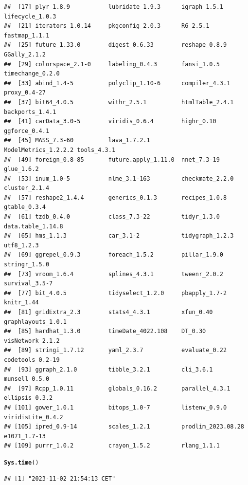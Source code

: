 \documentclass{article}\usepackage[]{graphicx}\usepackage[]{xcolor}
\makeatletter
\newcommand{\hlstd}[1]{\textcolor[rgb]{0.345,0.345,0.345}{#1}}%
\newcommand{\hlkwd}[1]{\textcolor[rgb]{0.737,0.353,0.396}{\textbf{#1}}}%
\newenvironment{kframe}{%
 \def\at@end@of@kframe{}%
 \ifinner\ifhmode%
  \def\at@end@of@kframe{\end{minipage}}%
  \begin{minipage}{\columnwidth}%
 \fi\fi%
 \def\FrameCommand##1{\hskip\@totalleftmargin \hskip-\fboxsep
 \colorbox{shadecolor}{##1}\hskip-\fboxsep
     \hskip-\linewidth \hskip-\@totalleftmargin \hskip\columnwidth}%
 \MakeFramed {\advance\hsize-\width
   \@totalleftmargin\z@ \linewidth\hsize
   \@setminipage}}%
 {\par\unskip\endMakeFramed%
 \at@end@of@kframe}
\newenvironment{knitrout}{}{} %
\makeatother
\begin{document}
\begin{knitrout}
\begin{kframe}
\begin{verbatim}
##  [17] plyr_1.8.9           lubridate_1.9.3      igraph_1.5.1         lifecycle_1.0.3     
##  [21] iterators_1.0.14     pkgconfig_2.0.3      R6_2.5.1             fastmap_1.1.1       
##  [25] future_1.33.0        digest_0.6.33        reshape_0.8.9        GGally_2.1.2        
##  [29] colorspace_2.1-0     labeling_0.4.3       fansi_1.0.5          timechange_0.2.0    
##  [33] abind_1.4-5          polyclip_1.10-6      compiler_4.3.1       proxy_0.4-27        
##  [37] bit64_4.0.5          withr_2.5.1          htmlTable_2.4.1      backports_1.4.1     
##  [41] carData_3.0-5        viridis_0.6.4        highr_0.10           ggforce_0.4.1       
##  [45] MASS_7.3-60          lava_1.7.2.1         ModelMetrics_1.2.2.2 tools_4.3.1         
##  [49] foreign_0.8-85       future.apply_1.11.0  nnet_7.3-19          glue_1.6.2          
##  [53] inum_1.0-5           nlme_3.1-163         checkmate_2.2.0      cluster_2.1.4       
##  [57] reshape2_1.4.4       generics_0.1.3       recipes_1.0.8        gtable_0.3.4        
##  [61] tzdb_0.4.0           class_7.3-22         tidyr_1.3.0          data.table_1.14.8   
##  [65] hms_1.1.3            car_3.1-2            tidygraph_1.2.3      utf8_1.2.3          
##  [69] ggrepel_0.9.3        foreach_1.5.2        pillar_1.9.0         stringr_1.5.0       
##  [73] vroom_1.6.4          splines_4.3.1        tweenr_2.0.2         survival_3.5-7      
##  [77] bit_4.0.5            tidyselect_1.2.0     pbapply_1.7-2        knitr_1.44          
##  [81] gridExtra_2.3        stats4_4.3.1         xfun_0.40            graphlayouts_1.0.1  
##  [85] hardhat_1.3.0        timeDate_4022.108    DT_0.30              visNetwork_2.1.2    
##  [89] stringi_1.7.12       yaml_2.3.7           evaluate_0.22        codetools_0.2-19    
##  [93] ggraph_2.1.0         tibble_3.2.1         cli_3.6.1            munsell_0.5.0       
##  [97] Rcpp_1.0.11          globals_0.16.2       parallel_4.3.1       ellipsis_0.3.2      
## [101] gower_1.0.1          bitops_1.0-7         listenv_0.9.0        viridisLite_0.4.2   
## [105] ipred_0.9-14         scales_1.2.1         prodlim_2023.08.28   e1071_1.7-13        
## [109] purrr_1.0.2          crayon_1.5.2         rlang_1.1.1
\end{verbatim}
\begin{alltt}
\hlkwd{Sys.time}\hlstd{()}
\end{alltt}
\begin{verbatim}
## [1] "2023-11-02 21:54:13 CET"
\end{verbatim}
\end{kframe}
\end{knitrout}
\end{document}
